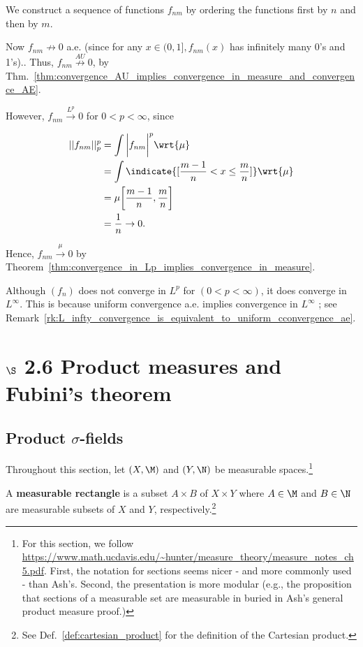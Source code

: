 \documentclass{article} %
\newcommand{\convergenceInMu}{\stackrel{\mu}{\to}}
\newcommand{\convergenceInLp}{\stackrel{L^p}{\to}}
\newcommand{\notConvergenceAU}{\stackrel{AU}{\not\to}}
\begin{document}
We construct a sequence of  functions $f_{nm}$ by ordering the functions first by $n$ and then by $m$.

Now $f_{nm} \not\to 0$ a.e. {\tiny (since for any $x \in (0,1], f_{nm}(x)$ has infinitely many 0's and 1's).}. Thus, $f_{nm} \notConvergenceAU 0$, by Thm.~\ref{thm:convergence_AU_implies_convergence_in_measure_and_convergence_AE}.
 
 However, $f_{nm}\convergenceInLp 0$ for $0<p<\infty$, since
  
 \begin{align*}
 ||f_{nm}||_p^p &= \int \bigg| f_{nm} \bigg|^p \wrt{\mu} \\
 &= \int \indicate{[\frac{m-1}{n} < x \leq \frac{m}{n}]}  \wrt{\mu} \\
 &= \mu \bigg[\frac{m-1}{n}, \frac{m}{n}\bigg] \\
 &= \frac{1}{n} \to 0. 
 \end{align*}

Hence, $f_{nm} \convergenceInMu 0$ by Theorem~\ref{thm:convergence_in_Lp_implies_convergence_in_measure}. 


\begin{remark}
Although $(f_n)$ does not converge in $L^p$ for $(0<p<\infty)$, it does converge in $L^\infty$. This is because uniform convergence a.e. implies convergence in $L^\infty$ ; see Remark~\ref{rk:L_infty_convergence_is_equivalent_to_uniform_cconvergence_ae}.
\end{remark}


\section{$\S$ 2.6 Product measures and Fubini's theorem}

\subsection{Product $\sigma$-fields}


Throughout this section, let $(X,\M)$ and $(Y,\N)$ be measurable spaces.\footnote{For this section, we follow \url{https://www.math.ucdavis.edu/~hunter/measure_theory/measure_notes_ch5.pdf}.  First, the notation for sections seems nicer - and more commonly used - than Ash's.  Second, the presentation is more modular (e.g., the proposition that sections of a measurable set are measurable in buried in Ash's general product measure proof.)}

\begin{definition}
A \textbf{measurable rectangle} is a subset $A \times B$ of $X \times Y$ where $A \in \M$ and $B \in \N$ are measurable subsets of $X$ and $Y$, respectively.\footnote{See Def.~\ref{def:cartesian_product} for the definition of the Cartesian product.}
\end{definition}
\end{document}

